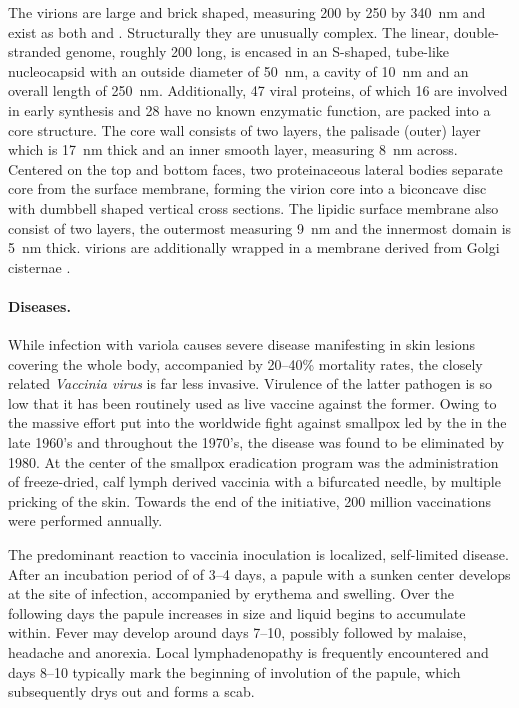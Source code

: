 The virions are large and brick shaped, measuring 200 by 250 by \SI{340}{\nano\meter} and exist as both  and . Structurally they are unusually complex. The linear, double-stranded  genome, roughly \SI{200}{\kilobase} long, is encased in an S-shaped, tube-like nucleocapsid with an outside diameter of \SI{50}{\nano\meter}, a cavity of \SI{10}{\nano\meter} and an overall length of \SI{250}{\nano\meter}. Additionally, 47 viral proteins, of which 16 are involved in early  synthesis and 28 have no known enzymatic function, are packed into a core structure. The core wall consists of two layers, the palisade (outer) layer which is \SI{17}{\nano\meter} thick and an inner smooth layer, measuring \SI{8}{\nano\meter} across. Centered on the top and bottom faces, two proteinaceous lateral bodies separate core from the surface membrane, forming the virion core into a biconcave disc with dumbbell shaped vertical cross sections. The lipidic surface membrane also consist of two layers, the outermost measuring \SI{9}{\nano\meter} and the innermost domain is \SI{5}{\nano\meter} thick.  virions are additionally wrapped in a membrane derived from Golgi cisternae \citep{Marennikova2005,Condit2006}.

\paragraph{Diseases.}
While infection with variola causes severe disease manifesting in skin lesions covering the whole body, accompanied by 20--40\% mortality rates, the closely related \textit{Vaccinia virus} is far less invasive. Virulence of the latter pathogen is so low that it has been routinely used as live vaccine against the former. Owing to the massive effort put into the worldwide fight against smallpox led by the  in the late 1960's and throughout the 1970's, the disease was found to be eliminated by 1980. At the center of the smallpox eradication program was the administration of freeze-dried, calf lymph derived vaccinia with a bifurcated needle, by multiple pricking of the skin. Towards the end of the initiative, 200 million vaccinations were performed annually.

The predominant reaction to vaccinia inoculation is localized, self-limited disease. After an incubation period of of 3--4 days, a papule with a sunken center develops at the site of infection, accompanied by erythema and swelling. Over the following days the papule increases in size and liquid begins to accumulate within. Fever may develop around days 7--10, possibly followed by malaise, headache and anorexia. Local lymphadenopathy is frequently encountered and days 8--10 typically mark the beginning of involution of the papule, which subsequently drys out and forms a scab.

